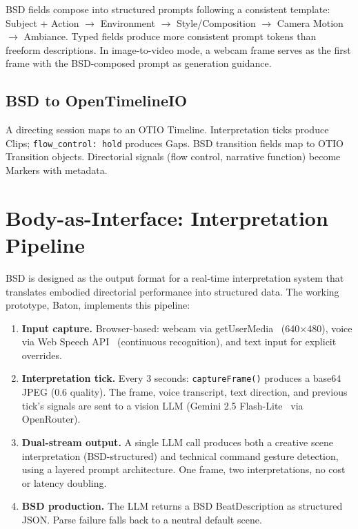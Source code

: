 \documentclass{article}
\begin{document}
BSD fields compose into structured prompts following a consistent template: Subject + Action $\rightarrow$ Environment $\rightarrow$ Style/Composition $\rightarrow$ Camera Motion $\rightarrow$ Ambiance. Typed fields produce more consistent prompt tokens than freeform descriptions. In image-to-video mode, a webcam frame serves as the first frame with the BSD-composed prompt as generation guidance.

\subsection{BSD to OpenTimelineIO}

A directing session maps to an OTIO Timeline. Interpretation ticks produce Clips; \texttt{flow\_control: hold} produces Gaps. BSD transition fields map to OTIO Transition objects. Directorial signals (flow control, narrative function) become Markers with metadata.

\section{Body-as-Interface: Interpretation Pipeline}\label{sec:pipeline}

BSD is designed as the output format for a real-time interpretation system that translates embodied directorial performance into structured data. The working prototype, Baton, implements this pipeline:

\begin{enumerate}
  \item \textbf{Input capture.} Browser-based: webcam via getUserMedia~\cite{getusermedia} (640$\times$480), voice via Web Speech API~\cite{webspeechapi} (continuous recognition), and text input for explicit overrides.
  \item \textbf{Interpretation tick.} Every 3 seconds: \texttt{captureFrame()} produces a base64 JPEG (0.6 quality). The frame, voice transcript, text direction, and previous tick's signals are sent to a vision LLM (Gemini 2.5 Flash-Lite~\cite{gemini2024} via OpenRouter).
  \item \textbf{Dual-stream output.} A single LLM call produces both a creative scene interpretation (BSD-structured) and technical command gesture detection, using a layered prompt architecture. One frame, two interpretations, no cost or latency doubling.
  \item \textbf{BSD production.} The LLM returns a BSD BeatDescription as structured JSON. Parse failure falls back to a neutral default scene.
\end{enumerate}
\end{document}
